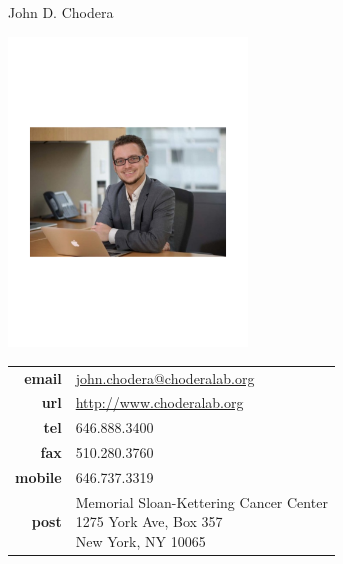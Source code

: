 \documentclass[10pt]{article}
\begin{document}
\reversemarginpar
{\selectfont \LARGE John D. Chodera}\\[1cm]

\begin{minipage}[t]{2.5in}
\includegraphics[width=2.5in,valign=c]{images/john_chodera_wide.pdf}
\end{minipage}
\quad
\begin{minipage}[t]{3in}
\begin{tabular}{rl}
{\bf email} & \href{mailto:choderaj@mskcc.org}{\href{mailto:john.chodera@choderalab.org}{john.chodera@choderalab.org}}\\
{\bf url} & \href{http://www.choderalab.org}{\href{http://www.choderalab.org}{http://www.choderalab.org}}\\[0.05in]
{\bf tel} & 646.888.3400\\[0.05in]
{\bf fax} & 510.280.3760 \\[0.05in]
{\bf mobile} & 646.737.3319\\[0.05in]
{\bf post} & 
\parbox[t]{3.0in}{Memorial Sloan-Kettering Cancer Center\\
1275 York Ave, Box 357\\
New York, NY 10065}
\end{tabular}
\end{minipage}

\end{document}

